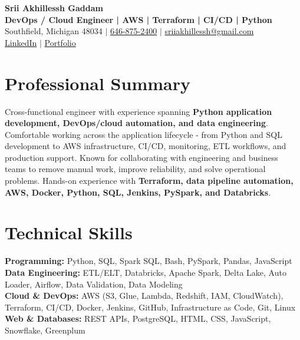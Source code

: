 \documentclass[letterpaper,10pt]{article}
\begin{document}
\fontsize{9.35pt}{10.45pt}\selectfont

\begin{center}
    {\LARGE \textbf{Srii Akhillessh Gaddam}} \\[-1pt]
    \textbf{DevOps / Cloud Engineer | AWS | Terraform | CI/CD | Python} \\[2pt]
    Southfield, Michigan 48034 $|$
    \href{tel:6468752400}{646-875-2400} $|$
    \href{mailto:sriiakhillessh@gmail.com}{sriiakhillessh@gmail.com} \\[1pt]
    \href{https://www.linkedin.com/in/srii-akhiilessh-gaddam-b48668191/}{LinkedIn} $|$
    \href{https://sriiakhillesshg.github.io/portfolio/}{Portfolio}
\end{center}
\vspace{-8pt}

\section{Professional Summary}
\small{Cross-functional engineer with experience spanning \textbf{Python application development, DevOps/cloud automation, and data engineering}. Comfortable working across the application lifecycle - from Python and SQL development to AWS infrastructure, CI/CD, monitoring, ETL workflows, and production support. Known for collaborating with engineering and business teams to remove manual work, improve reliability, and solve operational problems. Hands-on experience with \textbf{Terraform, data pipeline automation, AWS, Docker, Python, SQL, Jenkins, PySpark, and Databricks}.}

\section{Technical Skills}
\small{
\textbf{Programming:} Python, SQL, Spark SQL, Bash, PySpark, Pandas, JavaScript \\
\textbf{Data Engineering:} ETL/ELT, Databricks, Apache Spark, Delta Lake, Auto Loader, Airflow, Data Validation, Data Modeling \\
\textbf{Cloud \& DevOps:} AWS (S3, Glue, Lambda, Redshift, IAM, CloudWatch), Terraform, CI/CD, Docker, Jenkins, GitHub, Infrastructure as Code, Git, Linux \\
\textbf{Web \& Databases:} REST APIs, PostgreSQL, HTML, CSS, JavaScript, Snowflake, Greenplum
}
\end{document}
